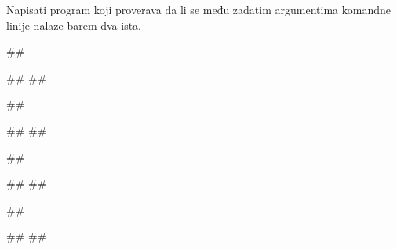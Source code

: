 \begin{Exercise}[label=p2.6_05] 
 Napisati program koji proverava da li se među zadatim argumentima 
 komandne linije nalaze barem dva ista.
 
\begin{miditest}
\begin{upotreba}{1}
##

#\naslovIzlaz#
##
\end{upotreba}
\end{miditest}
\begin{miditest}
\begin{upotreba}{2}
##

#\naslovIzlaz#
##
\end{upotreba}
\end{miditest}

\begin{miditest}
\begin{upotreba}{3}
##

#\naslovIzlaz#
##
\end{upotreba}
\end{miditest}
\begin{miditest}
\begin{upotreba}{4}
##

#\naslovIzlaz#
##
\end{upotreba}
\end{miditest}

\end{Exercise}
\ifresenja
\begin{Answer}[ref=p2.6_05]
\end{Answer}
 \fi


